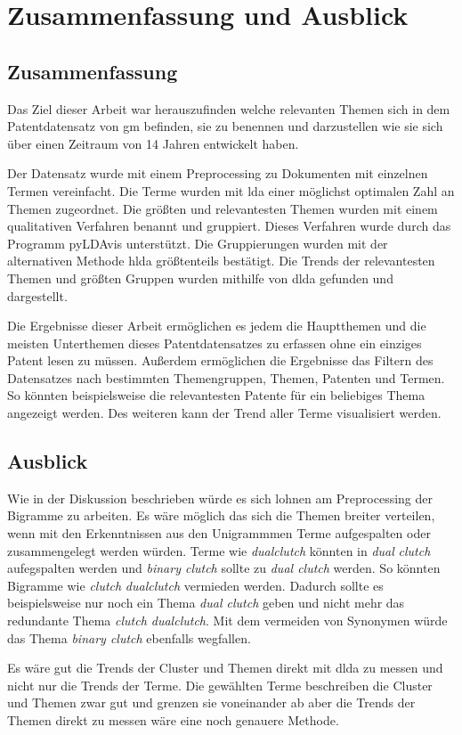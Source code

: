 \chapter{Zusammenfassung und Ausblick}




\section{Zusammenfassung}

Das Ziel dieser Arbeit war herauszufinden welche relevanten Themen sich in dem Patentdatensatz von \gls{gm} befinden, sie zu benennen und darzustellen wie sie sich über einen Zeitraum von 14 Jahren entwickelt haben.

Der Datensatz wurde mit einem Preprocessing zu Dokumenten mit einzelnen Termen vereinfacht. Die Terme wurden mit \gls{lda} einer möglichst optimalen Zahl an Themen zugeordnet. Die größten und relevantesten Themen wurden mit einem qualitativen Verfahren benannt und gruppiert. Dieses Verfahren wurde durch das Programm \gls{pyLDAvis} unterstützt. Die Gruppierungen wurden mit der alternativen Methode \gls{hlda} größtenteils bestätigt. Die Trends der relevantesten Themen und größten Gruppen wurden mithilfe von \gls{dlda} gefunden und dargestellt.

Die Ergebnisse dieser Arbeit ermöglichen es jedem die Hauptthemen und die meisten Unterthemen dieses Patentdatensatzes zu erfassen ohne ein einziges Patent lesen zu müssen. Außerdem ermöglichen die Ergebnisse das Filtern des Datensatzes nach bestimmten Themengruppen, Themen, Patenten und Termen. So könnten beispielsweise die relevantesten Patente für ein beliebiges Thema angezeigt werden. Des weiteren kann der Trend aller Terme visualisiert werden.



\section{Ausblick}

Wie in der Diskussion beschrieben würde es sich lohnen am Preprocessing der Bigramme zu arbeiten. Es wäre möglich das sich die Themen breiter verteilen, wenn mit den Erkenntnissen aus den Unigrammmen Terme aufgespalten oder zusammengelegt werden würden. Terme wie \emph{dualclutch} könnten in \emph{dual} \emph{clutch} aufegspalten werden und \emph{binary clutch} sollte zu \emph{dual clutch} werden. So könnten Bigramme wie \emph{clutch} \emph{dualclutch} vermieden werden. Dadurch sollte es beispielsweise nur noch ein Thema \emph{dual clutch} geben und nicht mehr das redundante Thema \emph{clutch dualclutch}. Mit dem vermeiden von Synonymen würde das Thema \emph{binary clutch} ebenfalls wegfallen.

Es wäre gut die Trends der Cluster und Themen direkt mit \gls{dlda} zu messen und nicht nur die Trends der Terme. Die gewählten Terme beschreiben die Cluster und Themen zwar gut und grenzen sie voneinander ab aber die Trends der Themen direkt zu messen wäre eine noch genauere Methode. 







